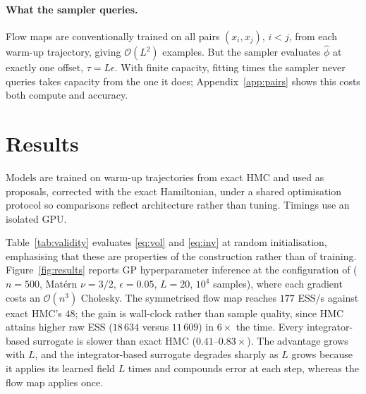 \documentclass[mlabstract,onecolumn]{jmlr}
\begin{document}
\paragraph{What the sampler queries.} Flow maps are conventionally trained on
all pairs $(x_i,x_j)$, $i<j$, from each warm-up trajectory, giving
$\mathcal{O}(L^2)$ examples. But the sampler evaluates $\hat\phi$ at exactly one
offset, $\tau = L\epsilon$. With finite capacity, fitting times the sampler
never queries takes capacity from the one it does; Appendix~\ref{app:pairs} shows this
costs both compute and accuracy.

\section{Results}

Models are trained on warm-up trajectories from exact HMC and used as proposals,
corrected with the exact Hamiltonian, under a shared optimisation protocol so
comparisons reflect architecture rather than tuning. Timings use an isolated GPU.

Table~\ref{tab:validity} evaluates \eqref{eq:vol} and \eqref{eq:inv} at random
initialisation, emphasising that these are properties of the construction rather
than of training. Figure~\ref{fig:results} reports GP hyperparameter inference at the
configuration of \citet{Li_2019} ($n=500$, Mat\'ern $\nu=3/2$, $\epsilon=0.05$,
$L=20$, $10^4$ samples), where each gradient costs an $\mathcal{O}(n^3)$
Cholesky. The symmetrised flow map reaches $177$ ESS/s against exact HMC's
$48$; the gain is wall-clock rather than sample quality, since HMC attains
higher raw ESS ($18\,634$ versus $11\,609$) in $6\times$ the time. Every
integrator-based surrogate is slower than exact HMC ($0.41$--$0.83\times$). The
advantage grows with $L$, and the integrator-based surrogate degrades sharply as
$L$ grows because it applies its learned field $L$ times and compounds error at
each step, whereas the flow map applies once.
\end{document}
